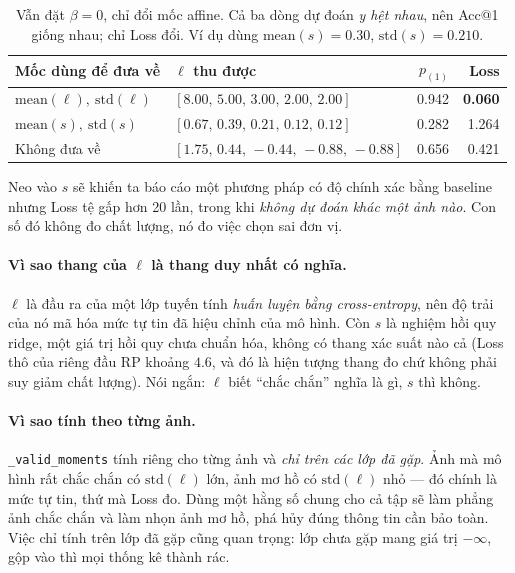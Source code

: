 \documentclass[11pt,a4paper]{article}
\begin{document}
\begin{table}[htbp]
\centering
\caption{Vẫn đặt $\beta = 0$, chỉ đổi mốc affine. Cả ba dòng dự đoán \emph{y hệt
nhau}, nên Acc@1 giống nhau; chỉ Loss đổi. Ví dụ dùng
$\mathrm{mean}(s) = 0.30$, $\mathrm{std}(s) = 0.210$.}
\label{tab:moc-affine}
\begin{tabular}{@{}llrr@{}}
\toprule
Mốc dùng để đưa về & $\hat\ell$ thu được & $p_{(1)}$ & Loss \\
\midrule
$\mathrm{mean}(\ell),\ \mathrm{std}(\ell)$
  & $[8.00,\, 5.00,\, 3.00,\, 2.00,\, 2.00]$ & 0.942 & \textbf{0.060} \\
$\mathrm{mean}(s),\ \mathrm{std}(s)$
  & $[0.67,\, 0.39,\, 0.21,\, 0.12,\, 0.12]$ & 0.282 & 1.264 \\
Không đưa về
  & $[1.75,\, 0.44,\, -0.44,\, -0.88,\, -0.88]$ & 0.656 & 0.421 \\
\bottomrule
\end{tabular}
\end{table}

Neo vào $s$ sẽ khiến ta báo cáo một phương pháp có độ chính xác bằng baseline
nhưng Loss tệ gấp hơn 20 lần, trong khi \emph{không dự đoán khác một ảnh nào}.
Con số đó không đo chất lượng, nó đo việc chọn sai đơn vị.

\paragraph{Vì sao thang của $\ell$ là thang duy nhất có nghĩa.}
$\ell$ là đầu ra của một lớp tuyến tính \emph{huấn luyện bằng cross-entropy}, nên
độ trải của nó mã hóa mức tự tin đã hiệu chỉnh của mô hình. Còn $s$ là nghiệm hồi
quy ridge, một giá trị hồi quy chưa chuẩn hóa, không có thang xác suất nào cả
(Loss thô của riêng đầu RP khoảng $4.6$, và đó là hiện tượng thang đo chứ không
phải suy giảm chất lượng). Nói ngắn: $\ell$ biết ``chắc chắn'' nghĩa là gì, $s$
thì không.

\paragraph{Vì sao tính theo từng ảnh.}
\texttt{\_valid\_moments} tính riêng cho từng ảnh và \emph{chỉ trên các lớp đã
gặp}. Ảnh mà mô hình rất chắc chắn có $\mathrm{std}(\ell)$ lớn, ảnh mơ hồ có
$\mathrm{std}(\ell)$ nhỏ --- đó chính là mức tự tin, thứ mà Loss đo. Dùng một
hằng số chung cho cả tập sẽ làm phẳng ảnh chắc chắn và làm nhọn ảnh mơ hồ, phá
hủy đúng thông tin cần bảo toàn. Việc chỉ tính trên lớp đã gặp cũng quan trọng:
lớp chưa gặp mang giá trị $-\infty$, gộp vào thì mọi thống kê thành rác.
\end{document}
